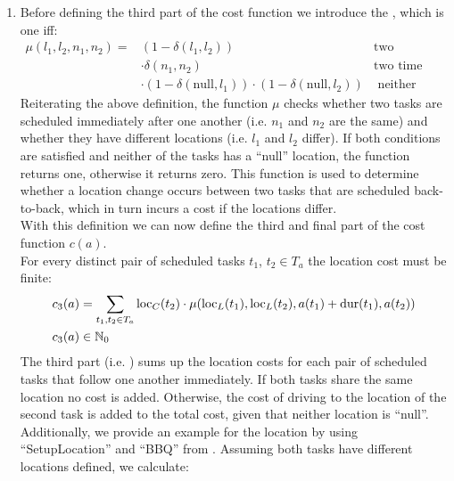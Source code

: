 \begin{itemize}
\begin{enumerate}
                  \item Before defining the third part of the cost function we introduce the , which is one iff:
                        \begin{align*}
                              \mu(l_1, l_2, n_1, n_2) = & (1 - \delta(l_1, l_2))                                                    & \text{two locations differ}          \\
                                                        & \cdot \delta(n_1, n_2)                                                    & \text{two time slots are the same}   \\
                                                        & \cdot (1 - \delta(\text{null}, l_1)) \cdot (1 - \delta(\text{null}, l_2)) & \text{ neither location is ``null''}
                        \end{align*}
                        Reiterating the above definition, the function $\mu$ checks whether two tasks are scheduled immediately after one another (i.e. $n_1$ and $n_2$ are the same) and whether they have different locations (i.e. $l_1$ and $l_2$ differ). If both conditions are satisfied and neither of the tasks has a ``null'' location, the function returns one, otherwise it returns zero. This function is used to determine whether a location change occurs between two tasks that are scheduled back-to-back, which in turn incurs a cost if the locations differ. \\
                        With this definition we can now define the third and final part of the cost function $c(a)$. \\
                        For every distinct pair of scheduled tasks $t_1$, $t_2 \in T_a$ the location cost must be finite:
                        \begin{align}
                              c_3(a) & = \sum_{t_1, t_2 \in T_a} \operatorname{loc}_C(t_2) \cdot \mu(\operatorname{loc}_L(t_1), \operatorname{loc}_L(t_2), a(t_1) + \operatorname{dur}(t_1), a(t_2))  \label{eq:cost-function-3} \\
                              c_3(a) & \in \mathbb{N}_0 \notag
                        \end{align}
                        The third part (i.e. ) sums up the location costs for each pair of scheduled tasks that follow one another immediately. If both tasks share the same location no cost is added. Otherwise, the cost of driving to the location of the second task is added to the total cost, given that neither location is ``null''. Additionally, we provide an example for the location by using ``SetupLocation'' and ``BBQ'' from . Assuming both tasks have different locations defined, we calculate:

\end{enumerate}
\end{itemize}
